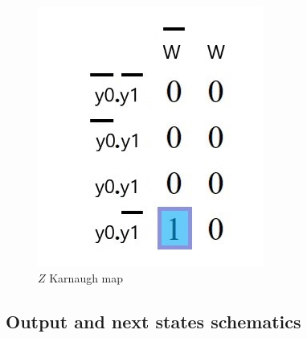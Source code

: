 \documentclass[../../e3_tp3_main.tex]{subfiles}
\begin{document}
\begin{figure}[H]
	\centering
	\includegraphics[scale=0.9]{figures/e3_tp3_ej2_mealy_z_kmap.jpg}
	\caption{$Z$ Karnaugh map}
\end{figure}

\subsection{Output and next states schematics}
\end{document}
